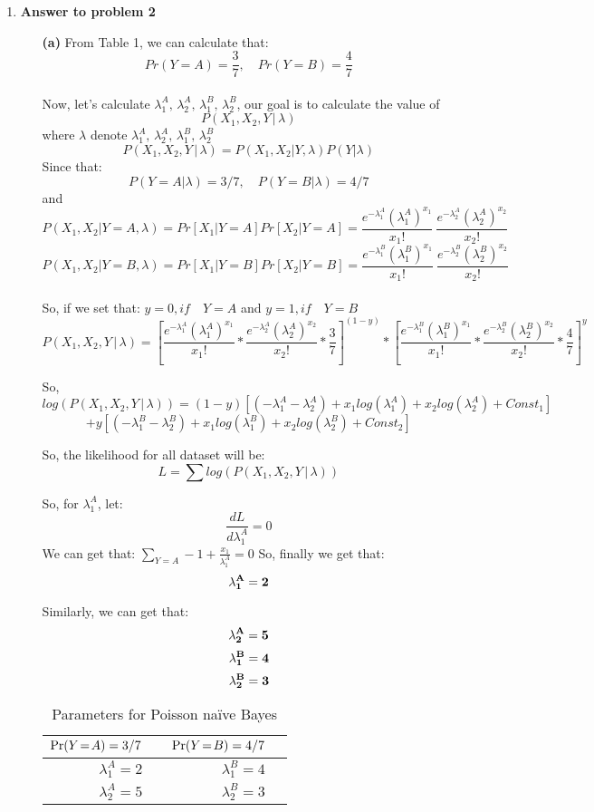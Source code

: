\begin{enumerate}
\item {\bf Answer to problem 2}

\begin{enumerate}
\item[{\bf (a)}]
From Table 1, we can calculate that: 
$$Pr(Y=A) = \frac{3}{7}, \quad Pr(Y=B) = \frac{4}{7}$$\\

Now, let's calculate $\lambda_1^A, \, \lambda_2^A, \, \lambda_1^B, \, \lambda_2^B$, our goal is to calculate the value of 
$$P(X_1, X_2, Y \, | \, \lambda)$$
where $\lambda$ denote $\lambda_1^A, \, \lambda_2^A, \, \lambda_1^B, \, \lambda_2^B$ \\

$$P(X_1, X_2, Y \, | \, \lambda) = P(X_1, X_2 | Y, \lambda) P(Y|\lambda)$$
Since that:
$$P(Y=A|\lambda) = 3/7, \quad P(Y=B|\lambda) = 4/7$$
and $$P(X_1, X_2 | Y=A, \lambda) = Pr[X_1 | Y = A]Pr[X_2 | Y = A] = \frac{e^{-\lambda^A_1} (\lambda^A_1)^{x_1} }{x_1!} \: \frac{e^{-\lambda^A_2} (\lambda^A_2)^{x_2} }{x_2!}$$
$$P(X_1, X_2 | Y=B, \lambda) = Pr[X_1 | Y = B]Pr[X_2 | Y = B] = \frac{e^{-\lambda^B_1} (\lambda^B_1)^{x_1} }{x_1!} \: \frac{e^{-\lambda^B_2} (\lambda^B_2)^{x_2} }{x_2!}$$\\

So, if we set that: $y=0, if \quad Y=A$ and $y=1, if \quad Y=B$
$$P(X_1, X_2, Y \, | \, \lambda) = [\frac{e^{-\lambda^A_1} (\lambda^A_1)^{x_1} }{x_1!} * \frac{e^{-\lambda^A_2}(\lambda^A_2)^{x_2} }{x_2!} * \frac{3}{7}]^{(1-y)} \ast [\frac{e^{-\lambda^B_1} (\lambda^B_1)^{x_1} }{x_1!} * \frac{e^{-\lambda^B_2} (\lambda^B_2)^{x_2} }{x_2!} * \frac{4}{7}]^y$$

So, 
$$log(P(X_1, X_2, Y \, | \, \lambda)) = (1-y)[(-\lambda_1^A-\lambda_2^A) + x_1log(\lambda_1^A) + x_2log(\lambda_2^A)+ Const_1]$$
$$ + y[(-\lambda_1^B-\lambda_2^B) + x_1log(\lambda_1^B) + x_2log(\lambda_2^B)+ Const_2]$$

So, the likelihood for all dataset will be: 
$$L = \sum log(P(X_1, X_2, Y \, | \, \lambda))$$

So, for $\lambda_1^A$, let:
$$\frac{dL}{d\lambda_1^A} = 0$$
We can get that: $\sum_{Y=A} -1 + \frac{x_1}{\lambda_1^A} = 0$
So, finally we get that: $${\bf \lambda_1^A = 2}$$

Similarly, we can get that:\\
$${\bf \lambda_2^A = 5}$$
$${\bf \lambda_1^B = 4}$$
$${\bf \lambda_2^B = 3}$$

\begin{table}[!h]
\begin{center}
\begin{tabular}{|rp{1in}|rp{1in}|}
\hline
$\Pr(Y\!=\!A)=3/7$ & & $\Pr(Y\!=\!B)=4/7$ & \\ \hline
$\lambda^A_1=2$ & & $\lambda^B_1=4$ & \\ \hline
$\lambda^A_2=5$ & & $\lambda^B_2=3$ & \\ \hline
\end{tabular}
\caption{Parameters for Poisson na\"ive Bayes}
\label{tab:poissonNBparams}
\end{center}
\end{table}


\end{enumerate}
\end{enumerate}
